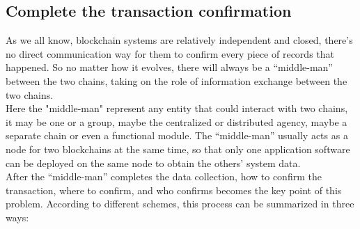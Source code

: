 \subsection{Complete the transaction confirmation}
\noindent As we all know, blockchain systems are relatively independent and closed, there's no direct communication way for them to confirm every piece of records that happened. So no matter how it evolves, there will always be a “middle-man” between the two chains, taking on the role of information exchange between the two chains.\\
\noindent Here the "middle-man" represent any entity that could interact with two chains, it may be one or a group, maybe the centralized or distributed agency, maybe a separate chain or even a functional module. The “middle-man” usually acts as a node for two blockchains at the same time, so that only one application software can be deployed on the same node to obtain the others' system data.\\
\noindent After the “middle-man” completes the data collection, how to confirm the transaction, where to confirm, and who confirms becomes the key point of this problem. According to different schemes, this process can be summarized in three ways:
